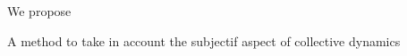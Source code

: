 \documentclass{beamer}
\begin{document}
\begin{frame}{We propose}
{\begin{block}{A method to take in account the subjectif aspect of collective dynamics}
{\begin{columns}
\begin{column}{.5\textwidth}
          \end{column}


\end{columns}}
\end{block}}
\end{frame}
\end{document}

